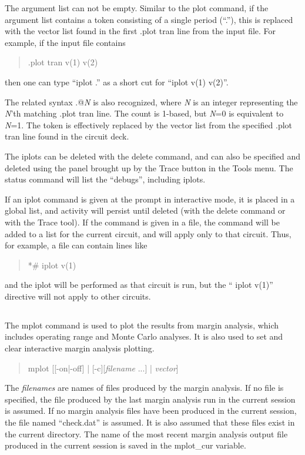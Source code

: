 The argument list can not be empty.  Similar to the {\cb plot}
command, if the argument list contains a token consisting of a single
period (``{\vt .}''), this is replaced with the vector list found in
the first {\vt .plot tran} line from the input file.  For example, if
the input file contains
\begin{quote} \vt
.plot tran v(1) v(2)
\end{quote}
then one can type ``{\vt iplot .}'' as a short cut for ``{\vt iplot
v(1) v(2)}''.

The related syntax {\vt .@}{\it N} is also recognized, where {\it N}
is an integer representing the {\it N\/}'th matching {\vt .plot tran}
line.  The count is 1-based, but {\it N\/}=0 is equivalent to {\it
N\/}=1.  The token is effectively replaced by the vector list from the
specified {\vt .plot tran} line found in the circuit deck.

The iplots can be deleted with the {\cb delete} command, and can also
be specified and deleted using the panel brought up by the {\cb Trace}
button in the {\cb Tools} menu.  The {\cb status} command will list
the ``debugs'', including iplots.

If an {\cb iplot} command is given at the prompt in interactive mode,
it is placed in a global list, and activity will persist until deleted
(with the {\cb delete} command or with the {\cb Trace} tool).  If the
command is given in a file, the command will be added to a list for
the current circuit, and will apply only to that circuit.  Thus, for
example, a {\WRspice} file can contain lines like
\begin{quote}\vt
*\# iplot v(1)
\end{quote}
and the iplot will be performed as that circuit is run, but the ``{\vt
iplot v(1)}'' directive will not apply to other circuits.

\subsection{}
\label{mplot}


The {\cb mplot} command is used to plot the results from margin analysis,
which includes operating range and Monte Carlo analyses.  It is also used
to set and clear interactive margin analysis plotting.
\begin{quote}\vt
mplot [[-on|-off] | [-c][{\it filename} ...] | {\it vector\/}]
\end{quote}
The {\it filenames} are names of files produced by the margin
analysis.  If no file is specified, the file produced by the last
margin analysis run in the current session is assumed.  If no margin
analysis files have been produced in the current session, the file
named ``{\vt check.dat}'' is assumed.  It is also assumed that these
files exist in the current directory.  The name of the most recent
margin analysis output file produced in the current session is saved
in the {\et mplot\_cur} variable.

